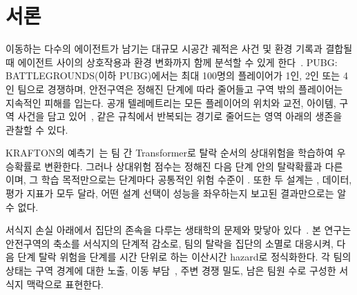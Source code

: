 \section{서론}
\label{sec:introduction}

이동하는 다수의 에이전트가 남기는 대규모 시공간 궤적은 사건 및 환경 기록과 결합될 때 에이전트 사이의 상호작용과 환경 변화까지 함께 분석할 수 있게 한다~\cite{Zheng15}.
PUBG: BATTLEGROUNDS(이하 PUBG)에서는 최대 100명의 플레이어가 1인, 2인 또는 4인 팀으로 경쟁하며, 안전구역은 정해진 단계에 따라 줄어들고 구역 밖의 플레이어는 지속적인 피해를 입는다.
공개 텔레메트리는 모든 플레이어의 위치와 교전, 아이템, 구역 사건을 담고 있어~\cite{PUBGAPI}, 같은 규칙에서 반복되는 경기로 줄어드는 영역 아래의 생존을 관찰할 수 있다.

 KRAFTON의 예측기~\cite{KRAFTON}는 팀 간 Transformer로 탈락 순서의 상대위험을 학습하여 우승확률로 변환한다.
그러나 상대위험 점수는 정해진 다음 단계 안의 탈락확률과 다른 이며, 그 학습 목적만으로는 단계마다 공통적인 위험 수준이 .
또한 두 설계는 , 데이터, 평가 지표가 모두 달라, 어떤 설계 선택이 성능을 좌우하는지 보고된 결과만으로는 알 수 없다.

 서식지 손실 아래에서 집단의 존속을 다루는 생태학의 문제와 맞닿아 있다~\cite{Fahrig03}.
본 연구는 안전구역의 축소를 서식지의 단계적 감소로, 팀의 탈락을 집단의 소멸로 대응시켜, 다음 단계 탈락 위험을 단계를 시간 단위로 하는 이산시간 hazard로 정식화한다.
각 팀의 상태는 구역 경계에 대한 노출,  이동 부담~\cite{Nathan08}, 주변 경쟁 밀도, 남은 팀원 수로 구성한 서식지 맥락으로 표현한다.

